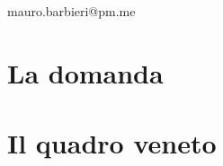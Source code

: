 \begin{titlepage}
  \vfill
  \begin{center}
    {\sffamily\small\color{white} mauro.barbieri@pm.me \par}
  \end{center}
  \vspace*{8mm}
\end{titlepage}



\tableofcontents

\mainmatter

\part{La domanda}





\part{Il quadro veneto}







